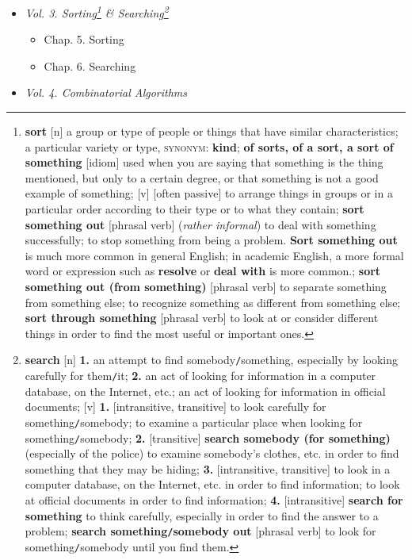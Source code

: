 \documentclass[oneside]{book}
\numberwithin{equation}{section}
\begin{document}
\begin{itemize}
	\item \textit{Vol. 3. Sorting\footnote{\textbf{sort} [n] a group or type of people or things that have similar characteristics; a particular variety or type, \textsc{synonym}: \textbf{kind}; \textbf{of sorts, of a sort, a sort of something} [idiom] used when you are saying that something is the thing mentioned, but only to a certain degree, or that something is not a good example of something; [v] [often passive] to arrange things in groups or in a particular order according to their type or to what they contain; \textbf{sort something out} [phrasal verb] (\textit{rather informal}) to deal with something successfully; to stop something from being a problem. \textbf{Sort something out} is much more common in general English; in academic English, a more formal word or expression such as \textbf{resolve} or \textbf{deal with} is more common.; \textbf{sort something out (from something)} [phrasal verb] to separate something from something else; to recognize something as different from something else; \textbf{sort through something} [phrasal verb] to look at or consider different things in order to find the most useful or important ones.} \& Searching\footnote{\textbf{search} [n] \textbf{1.} an attempt to find somebody\texttt{/}something, especially by looking carefully for them\texttt{/}it; \textbf{2.} an act of looking for information in a computer database, on the Internet, etc.; an act of looking for information in official documents; [v] \textbf{1.} [intransitive, transitive] to look carefully for something\texttt{/}somebody; to examine a particular place when looking for something\texttt{/}somebody; \textbf{2.} [transitive] \textbf{search somebody (for something)} (especially of the police) to examine somebody's clothes, etc. in order to find something that they may be hiding; \textbf{3.} [intransitive, transitive] to look in a computer database, on the Internet, etc. in order to find information; to look at official documents in order to find information; \textbf{4.} [intransitive] \textbf{search for something} to think carefully, especially in order to find the answer to a problem; \textbf{search something\texttt{/}somebody out} [phrasal verb] to look for something\texttt{/}somebody until you find them.}}
	\begin{itemize}
		\item Chap. 5. Sorting
		\item Chap. 6. Searching
	\end{itemize}
	\item \textit{Vol. 4. Combinatorial Algorithms}

\end{itemize}
\end{document}

